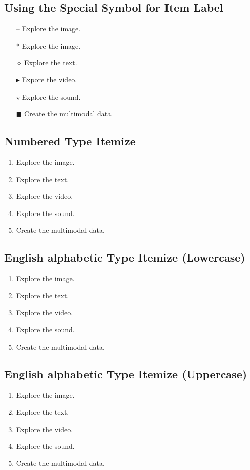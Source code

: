 \documentclass[11pt]{article}
\begin{document}
\subsection{Using the Special Symbol for Item Label}
\begin{itemize}
\item[--] Explore the image.
\item[*] Explore the image.
\item[$\diamond$] Explore the text.
\item[$\blacktriangleright$] Expore the video.
\item[$\star$] Explore the sound.
\item[$\blacksquare$] Create the multimodal data.
\end{itemize}

\subsection{Numbered Type Itemize}
\begin{enumerate}
\item Explore the image.
\item Explore the text.
\item Explore the video.
\item Explore the sound.
\item Create the multimodal data.
\end{enumerate}

\subsection{English alphabetic Type Itemize (Lowercase)}
\begin{enumerate}[a]
\item Explore the image.
\item Explore the text.
\item Explore the video.
\item Explore the sound.
\item Create the multimodal data.
\end{enumerate}

\subsection{English alphabetic Type Itemize (Uppercase)}
\begin{enumerate}[A]
\item Explore the image.
\item Explore the text.
\item Explore the video.
\item Explore the sound.
\item Create the multimodal data.
\end{enumerate}
\end{document}
